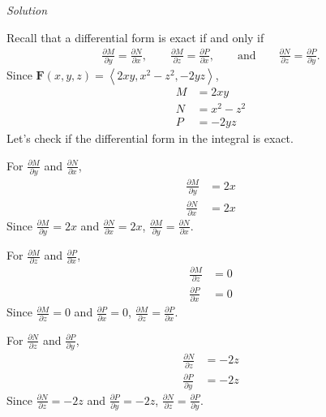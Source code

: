 \documentclass{article}
\newcommand{\lra}[1]{\left\langle #1 \right\rangle}
\newcommand{\F}[0]{\mathbf{F}}
\newcommand{\Solution}{\textit{Solution}}
\begin{document}
\Solution

Recall that a differential form is exact if and only if
\begin{align*}
    \frac{\partial M}{\partial y}=\frac{\partial N}{\partial x},\hspace{2em}\frac{\partial M}{\partial z}=\frac{\partial P}{\partial x},\hspace{2em} \text{and}\hspace{2em}\frac{\partial N}{\partial z}=\frac{\partial P}{\partial y}.
\end{align*}
Since $\displaystyle\F(x,y,z)=\lra{2xy,x^2-z^2,-2yz}$, \begin{align*}
    M&=2xy\\
    N&=x^2-z^2\\
    P&=-2yz
\end{align*}
Let's check if the differential form in the integral is exact.

{}
For $\displaystyle \frac{\partial M}{\partial y}$ and $\displaystyle\frac{\partial N}{\partial x}$,
\begin{align*}
    \frac{\partial M}{\partial y}&= 2x\\
    \frac{\partial N}{\partial x}&=2x
\end{align*}
Since $\displaystyle \frac{\partial M}{\partial y}=2x$ and $\displaystyle\frac{\partial N}{\partial x}=2x$, $\displaystyle \frac{\partial M}{\partial y}=\frac{\partial N}{\partial x}$.

{}
For $\displaystyle \frac{\partial M}{\partial z}$ and $\displaystyle\frac{\partial P}{\partial x}$,
\begin{align*}
    \frac{\partial M}{\partial z}&=0\\ \frac{\partial P}{\partial x}&=0
\end{align*}
Since $\displaystyle \frac{\partial M}{\partial z}=0$ and $\displaystyle\frac{\partial P}{\partial x}=0$, $\displaystyle \frac{\partial M}{\partial z}=\displaystyle\frac{\partial P}{\partial x}$.

{}
For $\displaystyle \frac{\partial N}{\partial z}$ and $\displaystyle \frac{\partial P}{\partial y}$,
\begin{align*}
    \frac{\partial N}{\partial z}&=-2z\\
    \frac{\partial P}{\partial y}&=-2z
\end{align*}
Since $\displaystyle \frac{\partial N}{\partial z}=-2z$ and $\displaystyle \frac{\partial P}{\partial y}=-2z$,  $\displaystyle \frac{\partial N}{\partial z}=\displaystyle \frac{\partial P}{\partial y}$.
\end{document}
